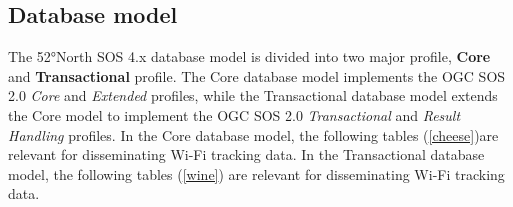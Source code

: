 \subsection{Database model}
The 52°North SOS 4.x database model is divided into two major profile,
\textbf{Core} and \textbf{Transactional} profile. The Core database model
implements the OGC SOS 2.0 \textit{Core} and \textit{Extended} profiles, while
the Transactional database model extends the Core model to implement the OGC SOS
2.0 \textit{Transactional} and \textit{Result Handling} profiles. In the Core database model, the following tables (\autoref{cheese})are relevant
for disseminating Wi-Fi tracking data. In the Transactional database model, the following tables (\autoref{wine}) are
relevant for disseminating Wi-Fi tracking data.

